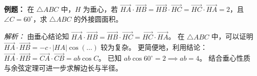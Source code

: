 \begin{examplebox}
\textbf{例题：} 在 $\triangle ABC$ 中，$H$ 为垂心，若 $\vec{HA} \cdot \vec{HB} = \vec{HB} \cdot \vec{HC} = \vec{HC} \cdot \vec{HA} = 2$，且 $\angle C = 60^\circ$，求 $\triangle ABC$ 的外接圆面积。

\textit{解析：} 
由垂心结论知 $\vec{HA} \cdot \vec{HB} = \vec{HB} \cdot \vec{HC} = \vec{HC} \cdot \vec{HA}$。
在 $\triangle ABC$ 中，可以证明 $\vec{HA} \cdot \vec{HB} = -c \cdot |HA| \cos(\dots)$ 较为复杂。
更简便地，利用结论：$\vec{HA} \cdot \vec{HB} = \vec{CA} \cdot \vec{CB} = ab \cos C$。
已知 $ab \cos 60^\circ = 2 \implies ab = 4$。
结合垂心性质与余弦定理可进一步求解边长与半径。
\end{examplebox}